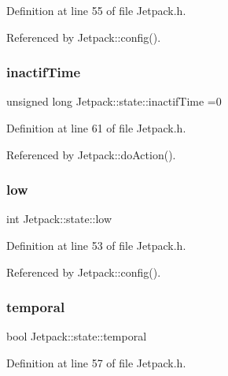 Definition at line 55 of file Jetpack.\+h.



Referenced by Jetpack\+::config().

\mbox{\label{structJetpack_1_1state_aaf817b1f9e7a4d65b9e3ca4726b281f6}} 
\subsubsection{\texorpdfstring{inactif\+Time}{inactifTime}}
{\footnotesize\ttfamily unsigned long Jetpack\+::state\+::inactif\+Time =0}



Definition at line 61 of file Jetpack.\+h.



Referenced by Jetpack\+::do\+Action().

\mbox{\label{structJetpack_1_1state_ace3ecd2b1f262756d8f7a8adda20136a}} 
\subsubsection{\texorpdfstring{low}{low}}
{\footnotesize\ttfamily int Jetpack\+::state\+::low}



Definition at line 53 of file Jetpack.\+h.



Referenced by Jetpack\+::config().

\mbox{\label{structJetpack_1_1state_abd6039e7a48856550b0ffbf8bcff7bdd}} 
\subsubsection{\texorpdfstring{temporal}{temporal}}
{\footnotesize\ttfamily bool Jetpack\+::state\+::temporal}



Definition at line 57 of file Jetpack.\+h.



